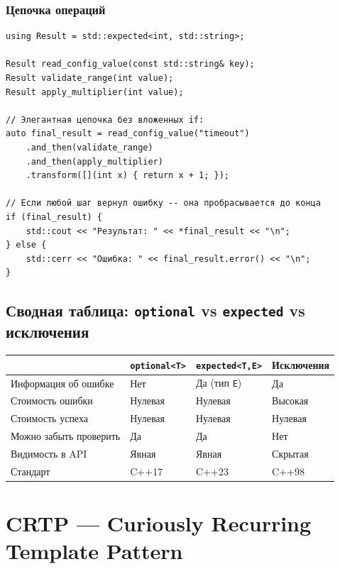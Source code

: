 \documentclass[a4paper,12pt]{article}
\begin{document}
\subsubsection{Цепочка операций}

\begin{lstlisting}
using Result = std::expected<int, std::string>;

Result read_config_value(const std::string& key);
Result validate_range(int value);
Result apply_multiplier(int value);

// Элегантная цепочка без вложенных if:
auto final_result = read_config_value("timeout")
    .and_then(validate_range)
    .and_then(apply_multiplier)
    .transform([](int x) { return x + 1; });

// Если любой шаг вернул ошибку -- она пробрасывается до конца
if (final_result) {
    std::cout << "Результат: " << *final_result << "\n";
} else {
    std::cerr << "Ошибка: " << final_result.error() << "\n";
}
\end{lstlisting}

\subsection{Сводная таблица: \texttt{optional} vs \texttt{expected} vs исключения}

\begin{center}
\begin{tabular}{lp{3.5cm}p{3.5cm}p{3.5cm}}
\toprule
& \texttt{optional<T>} & \texttt{expected<T,E>} & Исключения \\
\midrule
Информация об ошибке
    & Нет
    & Да (тип \texttt{E})
    & Да \\
\addlinespace
Стоимость ошибки
    & Нулевая
    & Нулевая
    & Высокая \\
\addlinespace
Стоимость успеха
    & Нулевая
    & Нулевая
    & Нулевая \\
\addlinespace
Можно забыть проверить
    & Да
    & Да
    & Нет \\
\addlinespace
Видимость в API
    & Явная
    & Явная
    & Скрытая \\
\addlinespace
Стандарт
    & C++17
    & C++23
    & C++98 \\
\bottomrule
\end{tabular}
\end{center}

\newpage
\section{CRTP --- Curiously Recurring Template Pattern}
\end{document}
